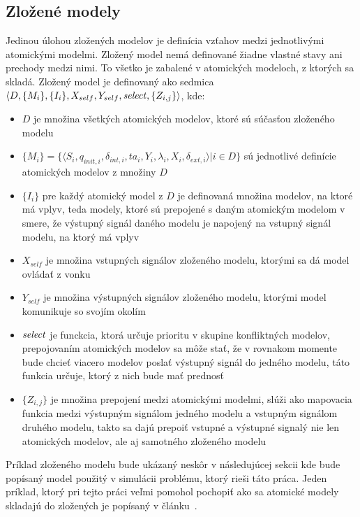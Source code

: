\subsection*{Zložené modely}
Jedinou úlohou zložených modelov je definícia vzťahov medzi jednotlivými atomickými modelmi.
Zložený model nemá definované žiadne vlastné stavy ani prechody medzi nimi.
To všetko je zabalené v atomických modeloch, z ktorých sa skladá.
Zložený model je definovaný ako sedmica $\langle D, \{M_i\}, \{I_i\}, X_{self}, Y_{self}, \text{\textit{select}}, \{Z_{i,j}\} \rangle$, kde:
\begin{itemize}
  \item $D$ je množina všetkých atomických modelov, ktoré sú súčasťou zloženého modelu
  \item $\{M_i\} = \{ \langle S_i, q_{init,i}, {\delta}_{int,i}, ta_i, Y_i, {\lambda}_i, X_i, {\delta}_{ext,i} \rangle | i \in D\}$ sú jednotlivé definície atomických modelov z množiny $D$
  \item $\{I_i\}$ pre každý atomický model z $D$ je definovaná množina modelov, na ktoré má vplyv, teda modely, ktoré sú prepojené s daným atomickým modelom v smere, že výstupný signál daného modelu je napojený na vstupný signál modelu, na ktorý má vplyv
  \item $X_{self}$ je množina vstupných signálov zloženého modelu, ktorými sa dá model ovládať z vonku
  \item $Y_{self}$ je množina výstupných signálov zloženého modelu, ktorými model komunikuje so svojím okolím
  \item $\text{\textit{select}}$ je funckcia, ktorá určuje prioritu v skupine konfliktných modelov, prepojovaním atomických modelov sa môže stať, že v rovnakom momente bude chcieť viacero modelov poslať výstupný signál do jedného modelu, táto funkcia určuje, ktorý z nich bude mať prednosť
  \item $\{Z_{i,j}\}$ je množina prepojení medzi atomickými modelmi, slúži ako mapovacia funkcia medzi výstupným signálom jedného modelu a vstupným signálom druhého modelu, takto sa dajú prepoiť vstupné a výstupné signalý nie len atomických modelov, ale aj samotného zloženého modelu
\end{itemize}
Príklad zloženého modelu bude ukázaný neskôr v následujúcej sekcii kde bude popísaný model použitý v simulácii problému, ktorý rieši táto práca.
Jeden príklad, ktorý pri tejto práci veľmi pomohol pochopiť ako sa atomické modely skladajú do zložených je popísaný v článku~\cite{seo2014devs}.

